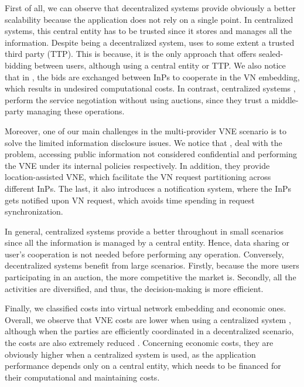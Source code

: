 First of all, we can observe that decentralized systems provide obviously a better scalability because the application does not rely on a single point. In centralized systems, this central entity has to be trusted since it stores and manages all the information. Despite being a decentralized system, \cite{zaheer2010multi} uses to some extent a trusted third party (TTP). This is because, it is the only approach that offers sealed-bidding between users, although using a central entity or TTP. We also notice that in \cite{esposito2013general}, \cite{chowdhury2010polyvine} the bids are exchanged between InPs to cooperate in the VN embedding, which results in undesired computational costs. In contrast, centralized systems \citep{dietrich2015multi}, perform the service negotiation without using auctions, since they trust a middle-party managing these operations.

Moreover, one of our main challenges in the multi-provider VNE scenario is to solve the limited information disclosure issues. We notice that \citep{dietrich2015multi}, \citep{chowdhury2010polyvine} deal with the problem, accessing public information not considered confidential and performing the VNE under its internal policies respectively. In addition, they provide location-assisted VNE, which facilitate the VN request partitioning across different InPs. The last, it also introduces a notification system, where the InPs gets notified upon VN request, which avoids time spending in request synchronization. 

In general, centralized systems provide a better throughout in small scenarios since all the information is managed by a central entity. Hence, data sharing or user's cooperation is not needed before performing any operation. Conversely, decentralized systems benefit from large scenarios. Firstly, because the more users participating in an auction, the more competitive the market is. Secondly, all the activities are diversified, and thus, the decision-making is more efficient. 

Finally, we classified costs into virtual network embedding and economic ones. Overall, we observe that VNE costs are lower when using a centralized system \citep{dietrich2015multi}, although when the parties are efficiently coordinated in a decentralized scenario, the costs are also extremely reduced \citep{chowdhury2010polyvine}. Concerning economic costs, they are obviously higher when a centralized system is used, as the application performance depends only on a central entity, which needs to be financed for their computational and maintaining costs.

